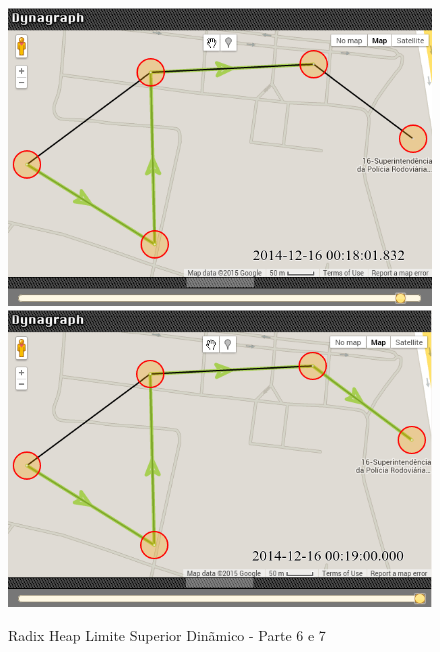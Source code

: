 \begin{figure}[htbp]
\centering
 \includegraphics[width=.45\textwidth]{chapters/fig/dyndyn6.png}
 \includegraphics[width=.45\textwidth]{chapters/fig/dyndyn7.png}
\caption{Radix Heap Limite Superior Dinãmico - Parte 6 e 7}
\label{fig:dyndyn4}
\end{figure}
\FloatBarrier




















